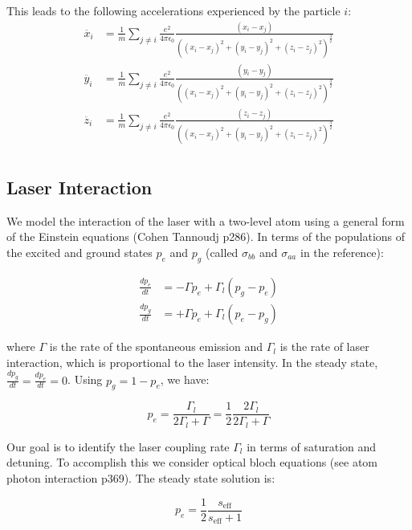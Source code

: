 \documentclass[a4paper,10pt]{article}
\begin{document}
This leads to the following accelerations experienced by the particle $i$:
\begin{align}
\ddot{x_i}&=\frac{1}{m} \displaystyle\sum_{j \neq i}\frac{e^2}{4 \pi \epsilon_0} \frac{(x_i - x_j)}{\left((x_i - x_j)^2 + (y_i - y_j)^2 +  (z_i - z_j)^2\right)^{\frac{3}{2}}}\\
\ddot{y_i}&=\frac{1}{m} \displaystyle\sum_{j \neq i}\frac{e^2}{4 \pi \epsilon_0} \frac{(y_i - y_j)}{\left((x_i - x_j)^2 + (y_i - y_j)^2 +  (z_i - z_j)^2\right)^{\frac{3}{2}}}\\
\ddot{z_i}&=\frac{1}{m} \displaystyle\sum_{j \neq i}\frac{e^2}{4 \pi \epsilon_0} \frac{(z_i - z_j)}{\left((x_i - x_j)^2 + (y_i - y_j)^2 +  (z_i - z_j)^2\right)^{\frac{3}{2}}}\\
\end{align}

\subsection{Laser Interaction}

We model the interaction of the laser with a two-level atom using a general form of the Einstein equations (Cohen Tannoudj p286). 
In terms of the populations of the excited and ground states $p_e$ and $p_g$ (called $\sigma_{bb}$ and $\sigma_{aa}$ in the reference):

\begin{align}
\frac{dp_{e}}{dt} &=   -\Gamma p_e + \Gamma_l (p_g - p_e) \\
\frac{dp_{g}}{dt} &=   +\Gamma p_e + \Gamma_l (p_e - p_g)
\end{align}

where $\Gamma$ is the rate of the spontaneous emission and $\Gamma_l$ is the rate of laser interaction, which is proportional to the laser intensity. 
In the steady state, $\frac{dp_{g}}{dt} = \frac{dp_{e}}{dt} = 0$. Using $p_g = 1 - p_e$, we have:

\begin{equation}
p_e= \frac{\Gamma_l}{2 \Gamma_l + \Gamma} = \frac{1}{2} \frac{2 \Gamma_l}{2 \Gamma_l + \Gamma} 
\end{equation}

Our goal is to identify the laser coupling rate $\Gamma_l$ in terms of saturation and detuning. To accomplish this we consider optical bloch equations (see atom photon interaction p369).
The steady state solution is:

\begin{equation}
p_e = \frac{1}{2} \frac{s_{\text{eff}}}{s_{\text{eff}}+1}
\end{equation}
\end{document}

